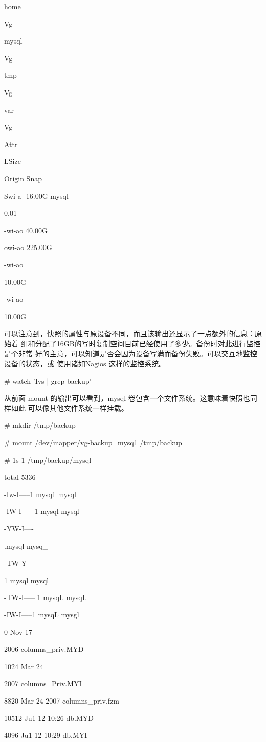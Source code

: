 home

Vg

mysql

Vg

tmp

Vg

var

Vg

Attr

LSize

Origin Snap%

Swi-a- 16.00G mysql

0.01

-wi-ao 40.00G

owi-ao 225.00G

-wi-ao

10.00G

-wi-ao

10.00G

可以注意到，快照的属性与原设备不同，而且该输出还显示了一点额外的信息：原始着
组和分配了16GB的写时复制空间目前已经使用了多少。备份时对此进行监控是个非常
好的主意，可以知道是否会因为设备写满而备份失败。可以交互地监控设备的状态，或
使用诸如Nagios 这样的监控系统。

# watch 'Ivs | grep backup'

从前面 mount 的输出可以看到，mysql 卷包含一个文件系统。这意味着快照也同样如此
可以像其他文件系统一样挂载。

# mkdir /tmp/backup

# mount /dev/mapper/vg-backup\_mysq1 /tmp/backup

# 1s-1 /tmp/backup/mysql

total 5336

-Iw-I-----1 mysq1 mysql

-IW-I----- 1 mysql mysql

-YW-I----

.mysql mysq\_

-TW-Y-----

1 mysql mysql

-TW-I----- 1 mysqL mysqL

-IW-I-----1 mysqL mysgl

0 Nov 17

2006 columns\_priv.MYD

1024 Mar 24

2007 columns\_Priv.MYI

8820 Mar 24 2007 columns\_priv.fzm

10512 Ju1 12 10:26 db.MYD

4096 Ju1 12 10:29 db.MYI

